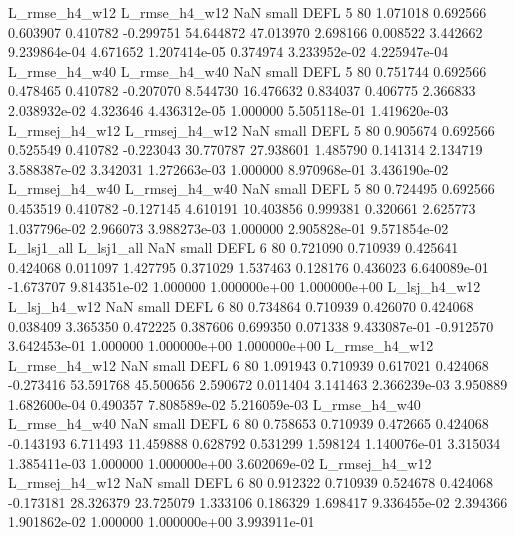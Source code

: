  L_rmse_h4_w12  L_rmse_h4_w12                   NaN      small     DEFL                 5 80 1.071018       0.692566 0.603907       0.410782   -0.299751     54.644872     47.013970     2.698166       0.008522  3.442662 9.239864e-04     4.671652   1.207414e-05            0.374974    3.233952e-02        4.225947e-04
 L_rmse_h4_w40  L_rmse_h4_w40                   NaN      small     DEFL                 5 80 0.751744       0.692566 0.478465       0.410782   -0.207070      8.544730     16.476632     0.834037       0.406775  2.366833 2.038932e-02     4.323646   4.436312e-05            1.000000    5.505118e-01        1.419620e-03
L_rmsej_h4_w12 L_rmsej_h4_w12                   NaN      small     DEFL                 5 80 0.905674       0.692566 0.525549       0.410782   -0.223043     30.770787     27.938601     1.485790       0.141314  2.134719 3.588387e-02     3.342031   1.272663e-03            1.000000    8.970968e-01        3.436190e-02
L_rmsej_h4_w40 L_rmsej_h4_w40                   NaN      small     DEFL                 5 80 0.724495       0.692566 0.453519       0.410782   -0.127145      4.610191     10.403856     0.999381       0.320661  2.625773 1.037796e-02     2.966073   3.988273e-03            1.000000    2.905828e-01        9.571854e-02
    L_lsj1_all     L_lsj1_all                   NaN      small     DEFL                 6 80 0.721090       0.710939 0.425641       0.424068    0.011097      1.427795      0.371029     1.537463       0.128176  0.436023 6.640089e-01    -1.673707   9.814351e-02            1.000000    1.000000e+00        1.000000e+00
  L_lsj_h4_w12   L_lsj_h4_w12                   NaN      small     DEFL                 6 80 0.734864       0.710939 0.426070       0.424068    0.038409      3.365350      0.472225     0.387606       0.699350  0.071338 9.433087e-01    -0.912570   3.642453e-01            1.000000    1.000000e+00        1.000000e+00
 L_rmse_h4_w12  L_rmse_h4_w12                   NaN      small     DEFL                 6 80 1.091943       0.710939 0.617021       0.424068   -0.273416     53.591768     45.500656     2.590672       0.011404  3.141463 2.366239e-03     3.950889   1.682600e-04            0.490357    7.808589e-02        5.216059e-03
 L_rmse_h4_w40  L_rmse_h4_w40                   NaN      small     DEFL                 6 80 0.758653       0.710939 0.472665       0.424068   -0.143193      6.711493     11.459888     0.628792       0.531299  1.598124 1.140076e-01     3.315034   1.385411e-03            1.000000    1.000000e+00        3.602069e-02
L_rmsej_h4_w12 L_rmsej_h4_w12                   NaN      small     DEFL                 6 80 0.912322       0.710939 0.524678       0.424068   -0.173181     28.326379     23.725079     1.333106       0.186329  1.698417 9.336455e-02     2.394366   1.901862e-02            1.000000    1.000000e+00        3.993911e-01
